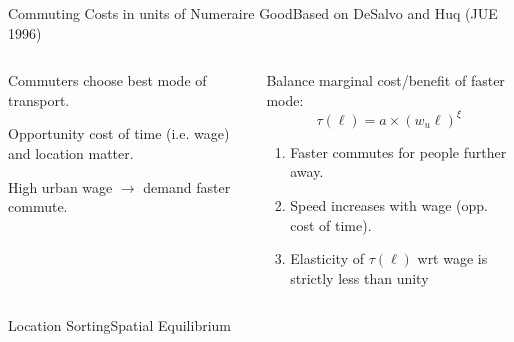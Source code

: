 \documentclass[aspectratio=169]{beamer}
\begin{document}
	

\begin{v75mins}
\begin{frame}{Commuting Costs in units of Numeraire Good}{Based on DeSalvo and Huq (JUE 1996)}

\begin{columns}
\begin{column}{0.5\textwidth}
\begin{midi}
\item Commuters choose best mode of transport.
\item Opportunity cost of time (i.e. wage) and location matter.
\item High urban wage $\rightarrow$ demand faster commute.
\end{midi}
\end{column}
\pause
\begin{column}{0.5\textwidth}
\begin{midi}
\item Balance marginal cost/benefit of faster mode:
\begin{equation*}
\tau(\ell) = a \times (w_u \ell)^\xi
\end{equation*}
\begin{enumerate}
\item Faster commutes for people further away.
\item Speed increases with wage (opp. cost of time).
\item Elasticity of $\tau(\ell)$ wrt wage is strictly less than unity%
\end{enumerate}
\end{midi}

\end{column}
\end{columns}

\end{frame}



\begin{frame}{Location Sorting}{Spatial Equilibrium}

\begin{columns}
\begin{column}{0.5\textwidth}


\end{column}
\end{columns}
\end{frame}
\end{v75mins}
\end{document}
